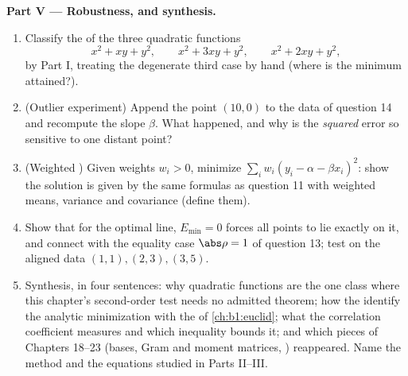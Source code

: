 \begin{problem}
\medskip
\noindent\textbf{Part V --- Robustness, and synthesis.}
\begin{enumerate}[resume]
  \item Classify the  of the three quadratic
        functions
        \[
        x^2 + xy + y^2, \qquad x^2 + 3xy + y^2, \qquad
        x^2 + 2xy + y^2 ,
        \]
        by Part I, treating the degenerate third case by hand
        (where is the minimum attained?).
  \item (Outlier experiment) Append the point $(10, 0)$ to the
        data of question 14 and recompute the slope $\beta$.
        What happened, and why is the \emph{squared} error so
        sensitive to one distant point?
  \item (Weighted ) Given weights $w_i > 0$,
        minimize $\sum_i w_i(y_i - \alpha - \beta x_i)^2$: show
        the solution is given by the same formulas as question
        11 with weighted means, variance and covariance
        (define them).
  \item Show that for the optimal line, $E_{\min} = 0$ forces
        all points to lie exactly on it, and connect with the
        equality case $\abs\rho = 1$ of question 13; test on the
        aligned data $(1,1), (2,3), (3,5)$.
  \item Synthesis, in four sentences: why quadratic functions
        are the one class where this chapter's second-order
        test needs no admitted theorem; how the 
        identify the analytic minimization with the  of \cref{ch:b1:euclid}; what the correlation
        coefficient measures and which inequality bounds it;
        and which pieces of Chapters 18--23 (bases, Gram and
        moment matrices, ) reappeared. Name the
        method and the equations studied in Parts II--III.
\end{enumerate}
\end{problem}
